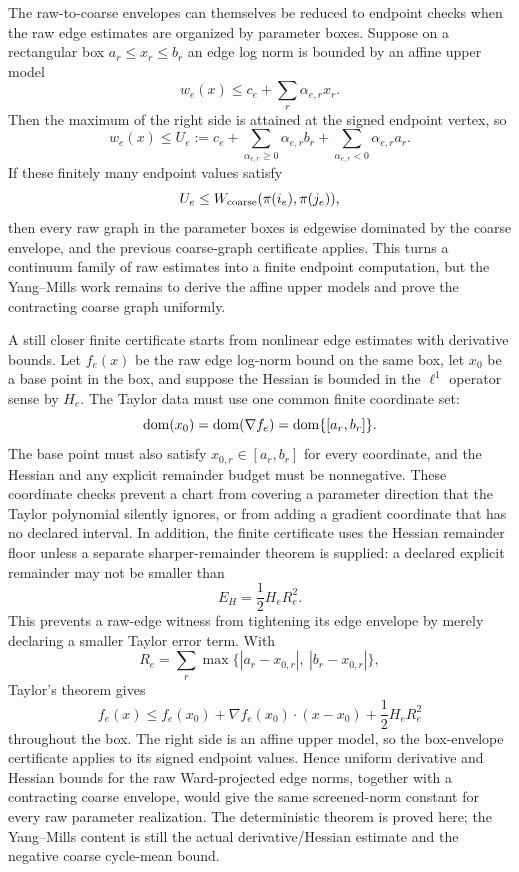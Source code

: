 The raw-to-coarse envelopes can themselves be reduced to endpoint checks when
the raw edge estimates are organized by parameter boxes. Suppose on a
rectangular box $a_r\leq x_r\leq b_r$ an edge log norm is bounded by an affine
upper model
\[
  w_e(x)\leq c_e+\sum_r\alpha_{e,r}x_r .
\]
Then the maximum of the right side is attained at the signed endpoint vertex,
so
\[
  w_e(x)\leq
  U_e
  :=
  c_e
  +\sum_{\alpha_{e,r}\geq0}\alpha_{e,r}b_r
  +\sum_{\alpha_{e,r}<0}\alpha_{e,r}a_r .
\]
If these finitely many endpoint values satisfy
\[
  U_e\leq W_{\rm coarse}(\pi(i_e),\pi(j_e)),
\]
then every raw graph in the parameter boxes is edgewise dominated by the
coarse envelope, and the previous coarse-graph certificate applies. This
turns a continuum family of raw estimates into a finite endpoint computation,
but the Yang--Mills work remains to derive the affine upper models and prove
the contracting coarse graph uniformly.

A still closer finite certificate starts from nonlinear edge estimates with
derivative bounds. Let $f_e(x)$ be the raw edge log-norm bound on the same box,
let $x_0$ be a base point in the box, and suppose the Hessian is bounded in
the $\ell^1$ operator sense by $H_e$. The Taylor data must use one common
finite coordinate set:
\[
  {\rm dom}(x_0)={\rm dom}(\nabla f_e)={\rm dom}\{[a_r,b_r]\}.
\]
The base point must also satisfy $x_{0,r}\in[a_r,b_r]$ for every coordinate,
and the Hessian and any explicit remainder budget must be nonnegative. These
coordinate checks prevent a chart from covering a parameter direction that the
Taylor polynomial silently ignores, or from adding a gradient coordinate that
has no declared interval. In addition, the finite certificate uses the Hessian
remainder floor unless a separate sharper-remainder theorem is supplied: a
declared explicit remainder may not be smaller than
\[
  E_H=\frac12 H_e R_e^2 .
\]
This prevents a raw-edge witness from tightening its edge envelope by merely
declaring a smaller Taylor error term. With
\[
  R_e=\sum_r\max\{|a_r-x_{0,r}|,\ |b_r-x_{0,r}|\},
\]
Taylor's theorem gives
\[
  f_e(x)
  \leq
  f_e(x_0)+\nabla f_e(x_0)\cdot(x-x_0)
  +\frac12 H_e R_e^2
\]
throughout the box. The right side is an affine upper model, so the
box-envelope certificate applies to its signed endpoint values. Hence
uniform derivative and Hessian bounds for the raw Ward-projected edge norms,
together with a contracting coarse envelope, would give the same screened-norm
constant for every raw parameter realization. The deterministic theorem is
proved here; the Yang--Mills content is still the actual derivative/Hessian
estimate and the negative coarse cycle-mean bound.

